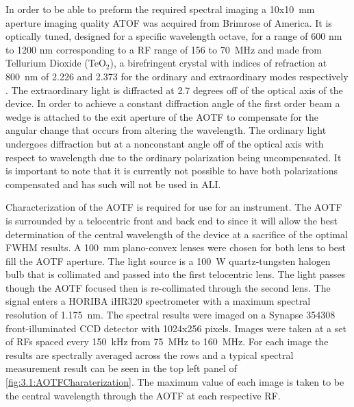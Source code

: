 \documentclass[12pt]{article}
\begin{document}
In order to be able to preform the required spectral imaging a 10x10~mm aperture imaging quality ATOF was acquired from Brimrose of America. It is optically tuned, designed for a specific wavelength octave, for a range of 600 nm to 1200 nm corresponding to a RF range of 156 to 70~MHz and made from Tellurium Dioxide (TeO$_{2}$), a birefringent crystal with indices of refraction at 800~nm of 2.226 and 2.373 for the ordinary and extraordinary modes respectively \citep{Uchida1971}. The extraordinary light is diffracted at 2.7 degrees off of the optical axis of the device. In order to achieve a constant diffraction angle of the first order beam a wedge is attached to the exit aperture of the AOTF to compensate for the angular change that occurs from altering the wavelength. The ordinary light undergoes diffraction but at a nonconstant angle off of the optical axis with respect to wavelength due to the ordinary polarization being uncompensated. It is important to note that it is currently not possible to have both polarizations compensated and has such will not be used in ALI.

Characterization of the AOTF is required for use for an instrument. The AOTF is surrounded by a telocentric front and back end to since it will allow the best determination of the central wavelength of the device at a sacrifice of the optimal FWHM results. A 100~mm plano-convex lenses were chosen for both lens to best fill the AOTF aperture. The light source is a 100~W quartz-tungsten halogen bulb that is collimated and passed into the first telocentric lens. The light passes though the AOTF focused then is re-collimated through the second lens. The signal enters a HORIBA iHR320 spectrometer with a maximum spectral resolution of 1.175~nm. The spectral results were imaged on a Synapse 354308 front-illuminated CCD detector with 1024x256 pixels. Images were taken at a set of RFs spaced every 150~kHz from 75~MHz to 160~MHz. For each image the results are spectrally averaged across the rows and a typical spectral measurement result can be seen in the top left panel of \autoref{fig:3.1:AOTFCharaterization}. The maximum value of each image is taken to be the central wavelength through the AOTF at each respective RF.
\end{document}
